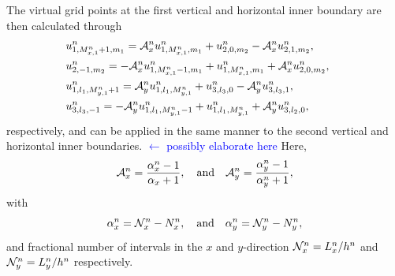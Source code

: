 \documentclass[fleqn]{jaes}
\def\SWcomment[#1]{\textcolor{blue}{#1}}
\begin{document}
The virtual grid points at the first vertical and horizontal inner boundary are then calculated through
\begin{subequations}\label{eq:connectionInterpol2D}
    \begin{align}
            \!\!\!\!\!\!\!\!&u_{1, M_{x,1}^n+1, m_1}^n = \Aterm_x u_{1, M_{x,1}^n, m_1}^n + u_{2, 0, m_2}^n - \Aterm_x u_{2, 1, m_2}^n,\\
            \!\!\!\!\!\!\!\!&u_{2, -1, m_2}^n = -\Aterm_x u_{1, M_{x, 1}^n-1, m_1}^n + u_{1, M_{x,1}^n, m_1}^n+\Aterm_x u_{2, 0, m_2}^n,\\
            \!\!\!\!\!\!\!\!&u_{1, l_1, M_{y,1}^n+1}^n = \Aterm_y u_{1, l_1, M_{y,1}^n}^n + u_{3, l_3, 0}^n - \Aterm_y u_{3, l_3, 1}^n,\\
           \!\!\!\!\!\!\!\!&u_{3, l_3, -1}^n = -\Aterm_y u_{1, l_1, M_{y, 1}^n-1}^n + u_{1, l_1, M_{y,1}^n}^n+\Aterm_y u_{3, l_2, 0}^n,
    \end{align}
\end{subequations}
respectively, and can be applied in the same manner to the second vertical and horizontal inner boundaries. \SWcomment[$\leftarrow$ possibly elaborate here] Here, 
\begin{equation}\label{eq:axayDef}
    \Aterm_x = \frac{\alpha_x^n-1}{\alpha_x+1}, \qaq \Aterm_y = \frac{\alpha_y^n-1}{\alpha_y^n+1},
\end{equation}
with 
\begin{equation}
    \alpha_x^n = \Nfrac_x^n - N_x^n, \qaq \alpha_y^n = \Nfrac_y^n - N_y^n,
\end{equation}
and fractional number of intervals in the $x$ and $y$-direction $\mathcal{N}_x^n = L_x^n / h^n$ and $\mathcal{N}_y^n = L_y^n / h^n$ respectively.
\end{document}
